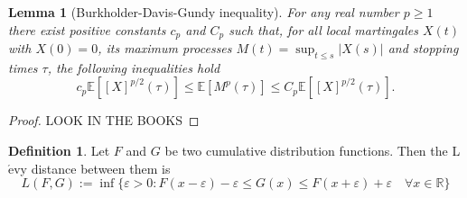 \documentclass[a4paper,11pt]{article}
\theoremstyle{plain}
\newtheorem{lmm}[thm]{Lemma}
\theoremstyle{definition}
\newtheorem{defn}[thm]{Definition}
\newcommand{\ME}{\mathbb{E}}
\newcommand{\MR}{\mathbb{R}}
\begin{document}
    \begin{lmm}[Burkholder-Davis-Gundy inequality] \label{BDG}
    	For any real number $p \geq 1$ there exist positive constants $c_p$ and $C_p$ such that, for all local martingales $X(t)$ with $X(0) = 0$, its maximum processes $M(t) = \sup_{t \leq s} |X(s)|$ and stopping times $\tau$, the following inequalities hold
    	\[ c_p \ME[[X]^{p/2}(\tau)] \leq \ME[M^p(\tau)] \leq C_p \ME[[X]^{p/2}(\tau)]. \]
    \end{lmm}
    \begin{proof}
    	LOOK IN THE BOOKS
    \end{proof}
    
    \begin{defn}
    	Let $F$ and $G$ be two cumulative distribution functions. Then the L$\acute{\text{e}}$vy distance between them is
    	\[ L(F, G) := \inf \{ \varepsilon > 0 : F(x-\varepsilon) -\varepsilon \leq G(x) \leq F(x+\varepsilon) + \varepsilon \quad \forall x\in\MR   \} \]
    \end{defn}
    
\end{document}
